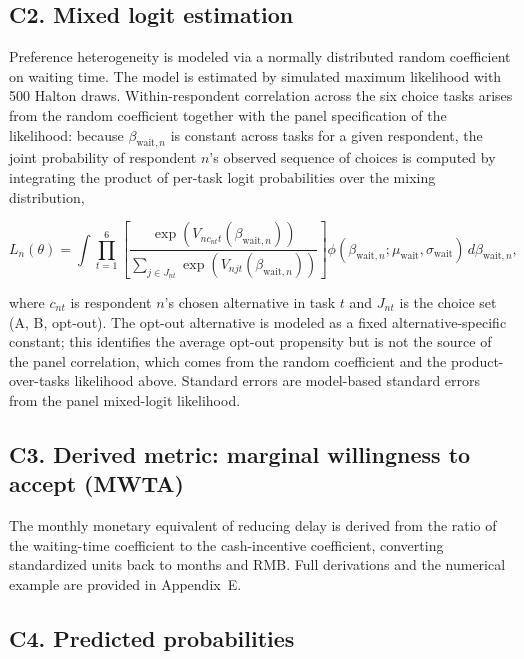 \subsection*{C2. Mixed logit estimation}

Preference heterogeneity is modeled via a normally distributed random coefficient on waiting time. The model is estimated by simulated maximum likelihood with 500 Halton draws. Within-respondent correlation across the six choice tasks arises from the random coefficient together with the panel specification of the likelihood: because $\beta_{\text{wait},n}$ is constant across tasks for a given respondent, the joint probability of respondent $n$'s observed sequence of choices is computed by integrating the product of per-task logit probabilities over the mixing distribution,

\[
L_n(\theta) = \int \prod_{t=1}^{6} \left[ \frac{\exp(V_{n c_{nt} t}(\beta_{\text{wait},n}))}{\sum_{j \in J_{nt}} \exp(V_{njt}(\beta_{\text{wait},n}))} \right] \phi(\beta_{\text{wait},n}; \mu_{\text{wait}}, \sigma_{\text{wait}})\, d\beta_{\text{wait},n},
\]

\noindent where $c_{nt}$ is respondent $n$'s chosen alternative in task $t$ and $J_{nt}$ is the choice set (A, B, opt-out). The opt-out alternative is modeled as a fixed alternative-specific constant; this identifies the average opt-out propensity but is not the source of the panel correlation, which comes from the random coefficient and the product-over-tasks likelihood above. Standard errors are model-based standard errors from the panel mixed-logit likelihood.

\subsection*{C3. Derived metric: marginal willingness to accept (MWTA)}

The monthly monetary equivalent of reducing delay is derived from the ratio of the waiting-time coefficient to the cash-incentive coefficient, converting standardized units back to months and RMB. Full derivations and the numerical example are provided in Appendix~E.

\subsection*{C4. Predicted probabilities}

